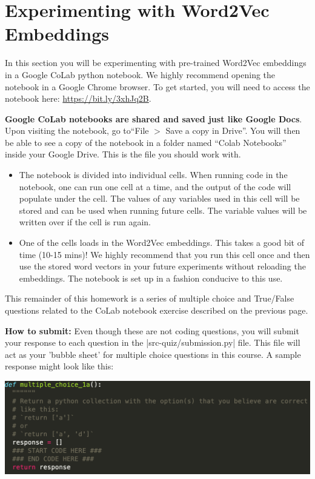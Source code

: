 \section{Experimenting with Word2Vec Embeddings}

In this section you will be experimenting with pre-trained Word2Vec embeddings in a Google CoLab python notebook. We highly recommend opening the notebook in a Google Chrome browser. To get started, you will need to access the notebook here: \url{https://bit.ly/3xhJq2B}.

\textbf{Google CoLab notebooks are shared and saved just like Google Docs}. Upon visiting the notebook, go to``File $>$ Save a copy in Drive''. You will then be able to see a copy of the notebook in a folder named “Colab Notebooks” inside your Google Drive. This is the file you should work with.

\begin{itemize}
    \item The notebook is divided into individual cells. When running code in the notebook, one can run one cell at a time, and the output of the code will populate under the cell. The values of any variables used in this cell will be stored and can be used when running future cells. The variable values will be written over if the cell is run again.  
    
    \item One of the cells loads in the Word2Vec embeddings. This takes a good bit of time (10-15 mins)! We highly recommend that you run this cell once and then use the stored word vectors in your future experiments without reloading the embeddings. The notebook is set up in a fashion conducive to this use.
\end{itemize}
\clearpage

This remainder of this homework is a series of multiple choice and True/False questions related to the CoLab notebook exercise described on the previous page.

{\bf How to submit:}  Even though these are not coding questions, you will submit your response to
each question in the |src-quiz/submission.py| file.  This file will act as
your 'bubble sheet' for multiple choice questions in this course.  A sample response
might look like this:

\begin{center}
\includegraphics[width=1\textwidth]{sample_question_empty.png}
\end{center}

